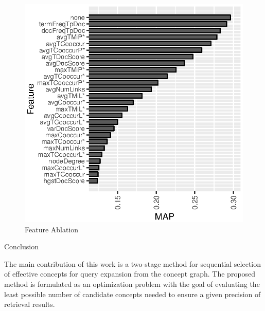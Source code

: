 \documentclass[final]{beamer}
\newlength{\onecolwid}
\begin{document}
\begin{frame}[t]
\begin{columns}[t]
\begin{column}{\onecolwid}
\begin{figure}
\includegraphics[width=0.9\linewidth]{images/featuresSorted.eps}
\caption{Feature Ablation}
\end{figure}


\begin{block}{Conclusion}

The main contribution of this work is a two-stage method
for sequential selection of effective concepts for query expansion from the concept graph. The proposed method is formulated as an optimization problem with the goal of evaluating the least possible number of candidate concepts needed
to ensure a given precision of retrieval results. 

\end{block}




\end{column}
\end{columns}
\end{frame}
\end{document}
